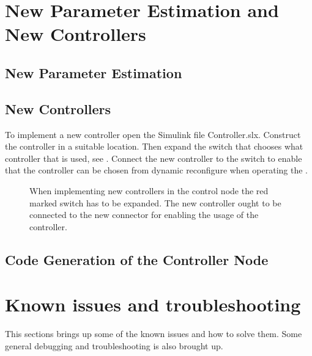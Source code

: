 \section{New Parameter Estimation and New Controllers}

\subsection{New Parameter Estimation}

\subsection{New Controllers}
To implement a new controller open the Simulink file Controller.slx. Construct the controller in a suitable location. Then expand the switch that chooses what controller that is used, see . Connect the new controller to the switch to enable that the controller can be chosen from dynamic reconfigure when operating the \abbrROV.

\begin{figure}
\centering
{}
    \caption{When implementing new controllers in the control node the red marked switch has to be expanded. The new controller ought to be connected to the new connector for enabling the usage of the controller.}
    \label{fig:controller_simulink}
\end{figure}

\subsection{Code Generation of the Controller Node}


\section{Known issues and troubleshooting}
This sections brings up some of the known issues and how to solve them. Some general debugging and troubleshooting is also brought up.

